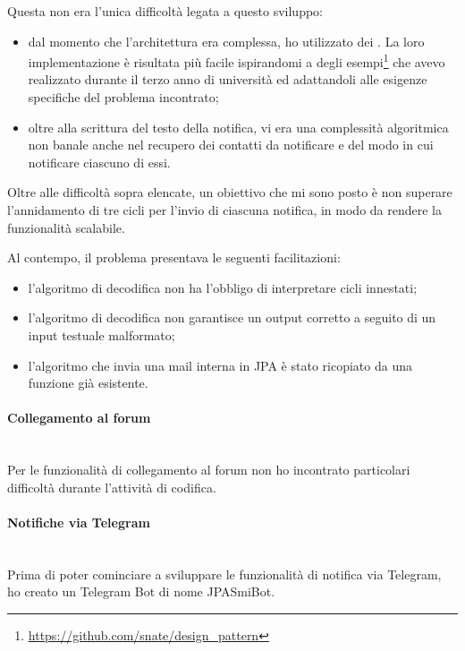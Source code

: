 Questa non era l'unica difficoltà legata a questo sviluppo:

\begin{itemize}
\item dal momento che l'architettura era complessa, ho utilizzato dei
  . La loro implementazione è risultata più facile
  ispirandomi a degli
  esempi\footnote{\url{https://github.com/snate/design_pattern}} che
  avevo realizzato durante il terzo anno di università ed adattandoli alle
  esigenze specifiche del problema incontrato;
\item oltre alla scrittura del testo della notifica, vi era una complessità
  algoritmica non banale anche nel recupero dei contatti da notificare e del
  modo in cui notificare ciascuno di essi.
\end{itemize}

Oltre alle difficoltà sopra elencate, un obiettivo che mi sono posto è non
superare l'annidamento di tre cicli per l'invio di ciascuna notifica, in modo
da rendere la funzionalità scalabile.

Al contempo, il problema presentava le seguenti facilitazioni:

\begin{itemize}
\item l'algoritmo di decodifica non ha l'obbligo di interpretare cicli
  innestati;
\item l'algoritmo di decodifica non garantisce un output corretto a seguito di
  un input testuale malformato;
\item l'algoritmo che invia una mail interna in JPA è stato ricopiato da una
  funzione già esistente.
\end{itemize}

\paragraph{Collegamento al forum} \mbox{} \\

Per le funzionalità di collegamento al forum non ho incontrato particolari
difficoltà durante l'attività di codifica.

\paragraph{Notifiche via Telegram} \mbox{} \\

Prima di poter cominciare a sviluppare le funzionalità di notifica via
Telegram, ho creato un Telegram Bot di nome JPASmiBot.

